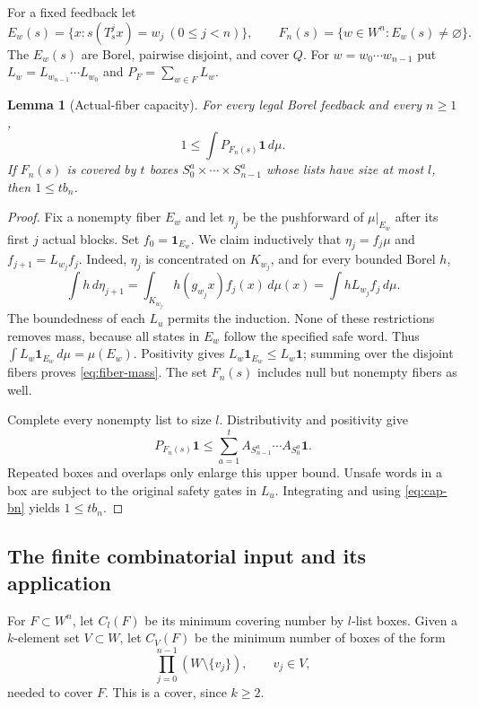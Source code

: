 \documentclass[11pt,reqno]{amsart}
\numberwithin{equation}{section}
\newtheorem{lemma}[theorem]{Lemma}
\theoremstyle{definition}
\newcommand{\one}{\mathbf 1}
\begin{document}
For a fixed feedback let
\[
 E_w(s)=\{x:s(T_s^jx)=w_j\ (0\le j<n)\},\qquad
 F_n(s)=\{w\in W^n:E_w(s)\ne\varnothing\}.
\]
The $E_w(s)$ are Borel, pairwise disjoint, and cover $Q$.
For $w=w_0\cdots w_{n-1}$ put
$L_w=L_{w_{n-1}}\cdots L_{w_0}$ and
$P_F=\sum_{w\in F}L_w$.

\begin{lemma}[Actual-fiber capacity]\label{lem:fiber-cap}
For every legal Borel feedback and every $n\ge1$,
\begin{equation}\label{eq:fiber-mass}
 1\le\int P_{F_n(s)}\one\,d\mu.
\end{equation}
If $F_n(s)$ is covered by $t$ boxes
$S^a_0\times\cdots\times S^a_{n-1}$ whose lists have size at
most $l$, then $1\le t b_n$.
\end{lemma}
\begin{proof}
Fix a nonempty fiber $E_w$ and let $\eta_j$ be the pushforward
of $\mu|_{E_w}$ after its first $j$ actual blocks. Set
$f_0=\one_{E_w}$. We claim inductively that
$\eta_j=f_j\mu$ and $f_{j+1}=L_{w_j}f_j$. Indeed,
$\eta_j$ is concentrated on $K_{w_j}$, and for every bounded Borel $h$,
\[
 \int h\,d\eta_{j+1}
 =\int_{K_{w_j}}h(g_{w_j}x)f_j(x)\,d\mu(x)
 =\int hL_{w_j}f_j\,d\mu.
\]
The boundedness of each $L_u$ permits the induction. None of these
restrictions removes mass, because all states in $E_w$ follow the
specified safe word. Thus $\int L_w\one_{E_w}\,d\mu=\mu(E_w)$.
Positivity gives $L_w\one_{E_w}\le L_w\one$; summing over the
disjoint fibers proves \eqref{eq:fiber-mass}. The set $F_n(s)$ includes
null but nonempty fibers as well.

Complete every nonempty list to size $l$. Distributivity and positivity
give
\[
 P_{F_n(s)}\one\le\sum_{a=1}^t
 A_{S^a_{n-1}}\cdots A_{S^a_0}\one.
\]
Repeated boxes and overlaps only enlarge this upper bound. Unsafe
words in a box are subject to the original safety gates in $L_u$.
Integrating and using \eqref{eq:cap-bn} yields $1\le tb_n$.
\end{proof}

\subsection{The finite combinatorial input and its application}
For $F\subset W^n$, let $C_l(F)$ be its minimum covering number by
$l$-list boxes. Given a $k$-element set $V\subset W$, let $C_V(F)$
be the minimum number of boxes of the form
\[
 \prod_{j=0}^{n-1}(W\setminus\{v_j\}),\qquad v_j\in V,
\]
needed to cover $F$. This is a cover, since $k\ge2$.
\end{document}
